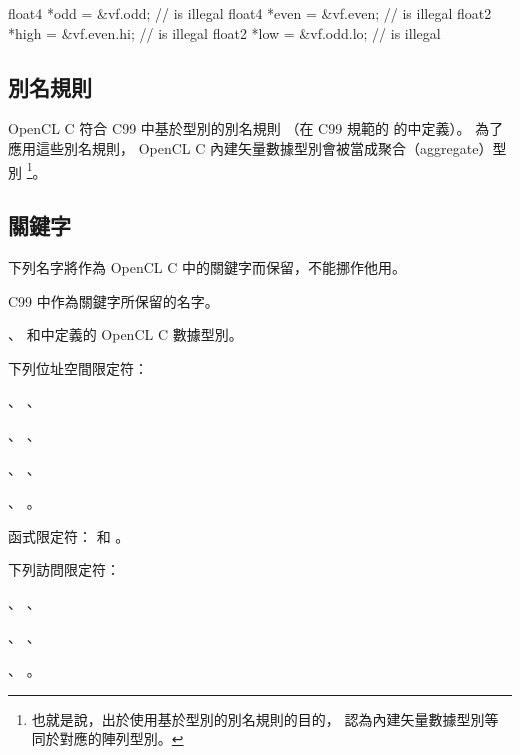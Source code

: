 float4	*odd = &vf.odd;		// is illegal
float4	*even = &vf.even;	// is illegal
float2	*high = &vf.even.hi;	// is illegal
float2	*low = &vf.odd.lo;	// is illegal
\stopclc

\subsection{別名規則}

OpenCL C  符合 C99 中基於型別的別名規則
（在 C99 規範的{} 的{}中定義）。
為了應用這些別名規則， OpenCL C 內建矢量數據型別會被當成聚合（aggregate）型別
\footnote{也就是說，出於使用基於型別的別名規則的目的，
認為內建矢量數據型別等同於對應的陣列型別。}。

\subsection{關鍵字}

下列名字將作為 OpenCL C 中的關鍵字而保留，不能挪作他用。
\startigBase
\item C99 中作為關鍵字所保留的名字。

\item {}、
和中定義的 OpenCL C 數據型別。

\startitem
下列位址空間限定符：
\startigBase
\item {}、 、
\item {}、 、
\item {}、 、
\item {}、 。
\stopigBase
\stopitem

\item 函式限定符：  和 。

\startitem
下列訪問限定符：
\startigBase
\item {}、 、
\item {}、 、
\item {}、 。
\stopigBase
\stopitem
\stopigBase

